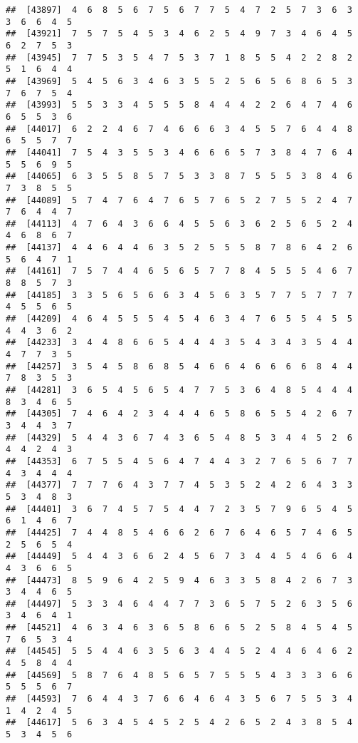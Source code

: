 \documentclass[
]{book}
\begin{document}
\begin{verbatim}
##  [43897]  4  6  8  5  6  7  5  6  7  7  5  4  7  2  5  7  3  6  3  3  6  6  4  5
##  [43921]  7  5  7  5  4  5  3  4  6  2  5  4  9  7  3  4  6  4  5  6  2  7  5  3
##  [43945]  7  7  5  3  5  4  7  5  3  7  1  8  5  5  4  2  2  8  2  5  1  6  4  4
##  [43969]  5  4  5  6  3  4  6  3  5  5  2  5  6  5  6  8  6  5  3  7  6  7  5  4
##  [43993]  5  5  3  3  4  5  5  5  8  4  4  4  2  2  6  4  7  4  6  6  5  5  3  6
##  [44017]  6  2  2  4  6  7  4  6  6  6  3  4  5  5  7  6  4  4  8  6  5  5  7  7
##  [44041]  7  5  4  3  5  5  3  4  6  6  6  5  7  3  8  4  7  6  4  5  5  6  9  5
##  [44065]  6  3  5  5  8  5  7  5  3  3  8  7  5  5  5  3  8  4  6  7  3  8  5  5
##  [44089]  5  7  4  7  6  4  7  6  5  7  6  5  2  7  5  5  2  4  7  7  6  4  4  7
##  [44113]  4  7  6  4  3  6  6  4  5  5  6  3  6  2  5  6  5  2  4  4  6  8  6  7
##  [44137]  4  4  6  4  4  6  3  5  2  5  5  5  8  7  8  6  4  2  6  5  6  4  7  1
##  [44161]  7  5  7  4  4  6  5  6  5  7  7  8  4  5  5  5  4  6  7  8  8  5  7  3
##  [44185]  3  3  5  6  5  6  6  3  4  5  6  3  5  7  7  5  7  7  7  4  5  5  6  5
##  [44209]  4  6  4  5  5  5  4  5  4  6  3  4  7  6  5  5  4  5  5  4  4  3  6  2
##  [44233]  3  4  4  8  6  6  5  4  4  4  3  5  4  3  4  3  5  4  4  4  7  7  3  5
##  [44257]  3  5  4  5  8  6  8  5  4  6  6  4  6  6  6  6  8  4  4  7  8  3  5  3
##  [44281]  3  6  5  4  5  6  5  4  7  7  5  3  6  4  8  5  4  4  4  8  3  4  6  5
##  [44305]  7  4  6  4  2  3  4  4  4  6  5  8  6  5  5  4  2  6  7  3  4  4  3  7
##  [44329]  5  4  4  3  6  7  4  3  6  5  4  8  5  3  4  4  5  2  6  4  4  2  4  3
##  [44353]  6  7  5  5  4  5  6  4  7  4  4  3  2  7  6  5  6  7  7  4  3  4  4  4
##  [44377]  7  7  7  6  4  3  7  7  4  5  3  5  2  4  2  6  4  3  3  5  3  4  8  3
##  [44401]  3  6  7  4  5  7  5  4  4  7  2  3  5  7  9  6  5  4  5  6  1  4  6  7
##  [44425]  7  4  4  8  5  4  6  6  2  6  7  6  4  6  5  7  4  6  5  2  5  6  5  4
##  [44449]  5  4  4  3  6  6  2  4  5  6  7  3  4  4  5  4  6  6  4  4  3  6  6  5
##  [44473]  8  5  9  6  4  2  5  9  4  6  3  3  5  8  4  2  6  7  3  3  4  4  6  5
##  [44497]  5  3  3  4  6  4  4  7  7  3  6  5  7  5  2  6  3  5  6  3  4  6  4  1
##  [44521]  4  6  3  4  6  3  6  5  8  6  6  5  2  5  8  4  5  4  5  7  6  5  3  4
##  [44545]  5  5  4  4  6  3  5  6  3  4  4  5  2  4  4  6  4  6  2  4  5  8  4  4
##  [44569]  5  8  7  6  4  8  5  6  5  7  5  5  5  4  3  3  3  6  6  5  5  5  6  7
##  [44593]  7  6  4  4  3  7  6  6  4  6  4  3  5  6  7  5  5  3  4  1  4  2  4  5
##  [44617]  5  6  3  4  5  4  5  2  5  4  2  6  5  2  4  3  8  5  4  5  3  4  5  6

\end{verbatim}
\end{document}
